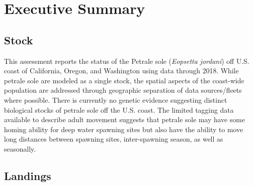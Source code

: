 \documentclass[12pt,]{article}
\begin{document}
\setcounter{page}{1} \renewcommand{\thefigure}{\alph{figure}}
\renewcommand{\thetable}{\alph{table}}

\section*{Executive Summary}\label{executive-summary}

\subsection*{Stock}\label{stock}

This assessment reports the status of the Petrale sole
(\emph{Eopsetta jordani}) off U.S. coast of California, Oregon, and
Washington using data through 2018. While petrale sole are modeled as a
single stock, the spatial aspects of the coast-wide population are
addressed through geographic separation of data sources/fleets where
possible. There is currently no genetic evidence suggesting distinct
biological stocks of petrale sole off the U.S. coast. The limited
tagging data available to describe adult movement suggests that petrale
sole may have some homing ability for deep water spawning sites but also
have the ability to move long distances between spawning sites,
inter-spawning season, as well as seasonally.

\subsection*{Landings}\label{landings}
\end{document}
